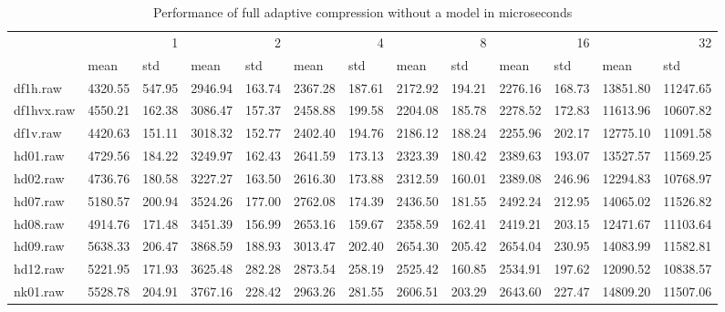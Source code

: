 \begin{table}
\caption{Performance of full adaptive compression without a model in microseconds}
\begin{tabular}{lllllllllllll}
 & \multicolumn{2}{r}{1} & \multicolumn{2}{r}{2} & \multicolumn{2}{r}{4} & \multicolumn{2}{r}{8} & \multicolumn{2}{r}{16} & \multicolumn{2}{r}{32} \\
 & mean & std & mean & std & mean & std & mean & std & mean & std & mean & std \\
df1h.raw & 4320.55 & 547.95 & 2946.94 & 163.74 & 2367.28 & 187.61 & 2172.92 & 194.21 & 2276.16 & 168.73 & 13851.80 & 11247.65 \\
df1hvx.raw & 4550.21 & 162.38 & 3086.47 & 157.37 & 2458.88 & 199.58 & 2204.08 & 185.78 & 2278.52 & 172.83 & 11613.96 & 10607.82 \\
df1v.raw & 4420.63 & 151.11 & 3018.32 & 152.77 & 2402.40 & 194.76 & 2186.12 & 188.24 & 2255.96 & 202.17 & 12775.10 & 11091.58 \\
hd01.raw & 4729.56 & 184.22 & 3249.97 & 162.43 & 2641.59 & 173.13 & 2323.39 & 180.42 & 2389.63 & 193.07 & 13527.57 & 11569.25 \\
hd02.raw & 4736.76 & 180.58 & 3227.27 & 163.50 & 2616.30 & 173.88 & 2312.59 & 160.01 & 2389.08 & 246.96 & 12294.83 & 10768.97 \\
hd07.raw & 5180.57 & 200.94 & 3524.26 & 177.00 & 2762.08 & 174.39 & 2436.50 & 181.55 & 2492.24 & 212.95 & 14065.02 & 11526.82 \\
hd08.raw & 4914.76 & 171.48 & 3451.39 & 156.99 & 2653.16 & 159.67 & 2358.59 & 162.41 & 2419.21 & 203.15 & 12471.67 & 11103.64 \\
hd09.raw & 5638.33 & 206.47 & 3868.59 & 188.93 & 3013.47 & 202.40 & 2654.30 & 205.42 & 2654.04 & 230.95 & 14083.99 & 11582.81 \\
hd12.raw & 5221.95 & 171.93 & 3625.48 & 282.28 & 2873.54 & 258.19 & 2525.42 & 160.85 & 2534.91 & 197.62 & 12090.52 & 10838.57 \\
nk01.raw & 5528.78 & 204.91 & 3767.16 & 228.42 & 2963.26 & 281.55 & 2606.51 & 203.29 & 2643.60 & 227.47 & 14809.20 & 11507.06 \\
\end{tabular}
\end{table}

